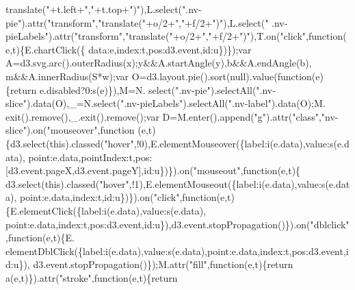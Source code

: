 \begin{DoxyCode}
{      translate("}+t.left+\textcolor{stringliteral}{","}+t.top+\textcolor{stringliteral}{")"}),L.select(\textcolor{stringliteral}{".nv-pie"}).attr(\textcolor{stringliteral}{"transform"},\textcolor{stringliteral}{"translate("}+o/2+\textcolor{stringliteral}{","}+f/2+\textcolor{stringliteral}{")"}),L.select(\textcolor{stringliteral}{"
      .nv-pieLabels"}).attr(\textcolor{stringliteral}{"transform"},\textcolor{stringliteral}{"translate("}+o/2+\textcolor{stringliteral}{","}+f/2+\textcolor{stringliteral}{")"}),T.on(\textcolor{stringliteral}{"click"},\textcolor{keyword}{function}(e,t)\{E.chartClick(\{
      data:e,index:t,pos:d3.event,\textcolor{keywordtype}{id}:u\})\});var A=d3.svg.arc().outerRadius(x);y&&A.startAngle(y),b&&A.endAngle(b),
      m&&A.innerRadius(S*w);var O=d3.layout.pie().sort(null).value(\textcolor{keyword}{function}(e)\{\textcolor{keywordflow}{return} e.disabled?0:s(e)\}),M=N.
      select(\textcolor{stringliteral}{".nv-pie"}).selectAll(\textcolor{stringliteral}{".nv-slice"}).data(O),\_=N.select(\textcolor{stringliteral}{".nv-pieLabels"}).selectAll(\textcolor{stringliteral}{".nv-label"}).data(O);M.
      exit().remove(),\_.exit().remove();var D=M.enter().append(\textcolor{stringliteral}{"g"}).attr(\textcolor{stringliteral}{"class"},\textcolor{stringliteral}{"nv-slice"}).on(\textcolor{stringliteral}{"mouseover"},\textcolor{keyword}{function}
      (e,t)\{d3.select(\textcolor{keyword}{this}).classed(\textcolor{stringliteral}{"hover"},!0),E.elementMouseover(\{label:i(e.data),value:s(e.data),
      point:e.data,pointIndex:t,pos:[d3.event.pageX,d3.event.pageY],\textcolor{keywordtype}{id}:u\})\}).on(\textcolor{stringliteral}{"mouseout"},\textcolor{keyword}{function}(e,t)\{
      d3.select(\textcolor{keyword}{this}).classed(\textcolor{stringliteral}{"hover"},!1),E.elementMouseout(\{label:i(e.data),value:s(e.data),
      point:e.data,index:t,\textcolor{keywordtype}{id}:u\})\}).on(\textcolor{stringliteral}{"click"},\textcolor{keyword}{function}(e,t)\{E.elementClick(\{label:i(e.data),value:s(e.data),
      point:e.data,index:t,pos:d3.event,\textcolor{keywordtype}{id}:u\}),d3.event.stopPropagation()\}).on(\textcolor{stringliteral}{"dblclick"},\textcolor{keyword}{function}(e,t)\{E.
      elementDblClick(\{label:i(e.data),value:s(e.data),point:e.data,index:t,pos:d3.event,\textcolor{keywordtype}{id}:u\}),
      d3.event.stopPropagation()\});M.attr(\textcolor{stringliteral}{"fill"},\textcolor{keyword}{function}(e,t)\{\textcolor{keywordflow}{return} a(e,t)\}).attr(\textcolor{stringliteral}{"stroke"},\textcolor{keyword}{function}(e,t)\{\textcolor{keywordflow}{return}

\end{DoxyCode}
